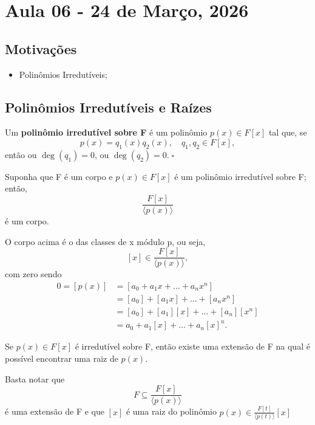 \documentclass[../algebraIII_notes.tex]{subfiles}
\begin{document}
\section{Aula 06 - 24 de Março, 2026}
\subsection{Motivações}
\begin{itemize}
	\item Polinômios Irredutíveis;
\end{itemize}
\subsection{Polinômios Irredutíveis e Raízes}
\begin{def*}
	Um \textbf{polinômio irredutível sobre F} é um polinômio \(p(x)\in F[x]\) tal que, se
	\[
		p(x)=q_{1}(x)q_{2}(x), \quad q_{1}, q_{2}\in F[x],
	\]
	então ou \(\deg{(q_{1})}=0\), ou \(\deg{(q_{2})}=0. \; \square\)
\end{def*}
\begin{lemma*}
	Suponha que F é um corpo e \(p(x)\in F[x]\) é um polinômio irredutível sobre F; então,
	\[
		\frac{F[x]}{\langle p(x) \rangle}
	\]
	é um corpo.
\end{lemma*}
O corpo acima é o das classes de x módulo p, ou seja,
\[
	[x]\in \frac{F[x]}{\langle p(x) \rangle},
\]
com zero sendo
\begin{align*}
	0=[p(x)] & = [a_{0}+a_1x+\dotsc +a_{n}x^{n}]         \\
	         & = [a_{0}]+[a_1x]+ \dotsc + [a_{n}x^{n}]   \\
	         & = [a_{0}]+[a_1][x]+\dotsc +[a_{n}][x^{n}] \\
	         & = a_{0}+a_{1}[x]+\dotsc +a_{n}[x]^{n}.
\end{align*}
\begin{lemma*}
	Se \(p(x)\in F[x]\) é irredutível sobre F, então existe uma extensão de F na qual é possível encontrar uma raiz de \(p(x)\).
\end{lemma*}
\begin{proof*}
	Basta notar que
	\[
		F \subseteq \frac{F[x]}{\langle p(x) \rangle}
	\]
	é uma extensão de F e que \([x]\) é uma raiz do polinômio \(p(x)\in \frac{F[t]}{\langle p(t) \rangle}[x]\)
\end{proof*}
\end{document}
